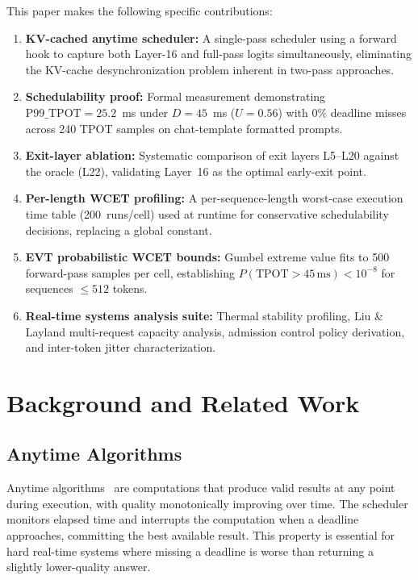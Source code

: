 \documentclass[conference]{IEEEtran}
\begin{document}
This paper makes the following specific contributions:

\begin{enumerate}[leftmargin=*]
    \item \textbf{KV-cached anytime scheduler:} A single-pass scheduler using a forward hook to capture both Layer-16 and full-pass logits simultaneously, eliminating the KV-cache desynchronization problem inherent in two-pass approaches.

    \item \textbf{Schedulability proof:} Formal measurement demonstrating $\text{P99\_TPOT} = 25.2$~ms under $D = 45$~ms ($U = 0.56$) with 0\% deadline misses across 240 TPOT samples on chat-template formatted prompts.

    \item \textbf{Exit-layer ablation:} Systematic comparison of exit layers L5--L20 against the oracle (L22), validating Layer~16 as the optimal early-exit point.

    \item \textbf{Per-length WCET profiling:} A per-sequence-length worst-case execution time table (200~runs/cell) used at runtime for conservative schedulability decisions, replacing a global constant.

    \item \textbf{EVT probabilistic WCET bounds:} Gumbel extreme value fits to 500 forward-pass samples per cell, establishing $P(\text{TPOT} > 45\,\text{ms}) < 10^{-8}$ for sequences $\leq 512$ tokens.

    \item \textbf{Real-time systems analysis suite:} Thermal stability profiling, Liu \& Layland multi-request capacity analysis, admission control policy derivation, and inter-token jitter characterization.
\end{enumerate}

\section{Background and Related Work}

\subsection{Anytime Algorithms}

Anytime algorithms~\cite{zilberstein1996using,boddy1994deliberation} are computations that produce valid results at any point during execution, with quality monotonically improving over time. The scheduler monitors elapsed time and interrupts the computation when a deadline approaches, committing the best available result. This property is essential for hard real-time systems where missing a deadline is worse than returning a slightly lower-quality answer.
\end{document}
